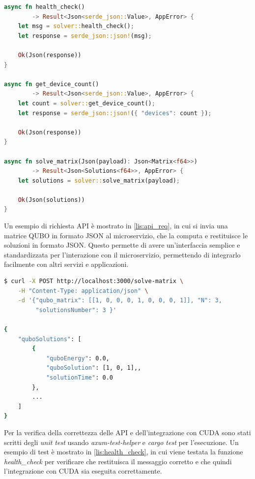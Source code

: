 \vspace{5mm}
\begin{lstlisting}[language=Rust, caption=Web API, label=lis:api]
async fn health_check()
        -> Result<Json<serde_json::Value>, AppError> {
    let msg = solver::health_check();
    let response = serde_json::json!(msg);

    Ok(Json(response))
}

async fn get_device_count()
        -> Result<Json<serde_json::Value>, AppError> {
    let count = solver::get_device_count();
    let response = serde_json::json!({ "devices": count });

    Ok(Json(response))
}

async fn solve_matrix(Json(payload): Json<Matrix<f64>>)
        -> Result<Json<Solutions<f64>>, AppError> {
    let solutions = solver::solve_matrix(payload);

    Ok(Json(solutions))
}
\end{lstlisting}
\vspace{5mm}


Un esempio di richiesta \gls{API} è mostrato in \ref{lis:api_req}, in cui si invia una matrice \gls{QUBO} in formato \gls{JSON} al microservizio, che la computa e restituisce le soluzioni in formato \gls{JSON}. Questo permette di avere un'interfaccia semplice e standardizzata per l'interazione con il microservizio, permettendo di integrarlo facilmente con altri servizi e applicazioni.

\newpage
\vspace{5mm}
\begin{lstlisting}[language=bash, caption=Esempio richiesta API, label=lis:api_req]
$ curl -X POST http://localhost:3000/solve-matrix \
    -H "Content-Type: application/json" \
    -d '{"qubo_matrix": [[1, 0, 0, 0, 1, 0, 0, 0, 1]], "N": 3,
         "solutionsNumber": 3 }'

{
    "quboSolutions": [
        {
            "quboEnergy": 0.0,
            "quboSolution": [1, 0, 1],,
            "solutionTime": 0.0
        },
        ...
    ]
}
\end{lstlisting}
\vspace{5mm}

Per la verifica della correttezza delle API e dell'integrazione con \gls{CUDA} sono stati scritti degli \textit{unit test} usando \textit{axum-test-helper} e \textit{cargo test} per l'esecuzione. Un esempio di test è mostrato in \ref{lis:health_check}, in cui viene testata la funzione \textit{health\_check} per verificare che restituisca il messaggio corretto e che quindi l'integrazione con \gls{CUDA} sia eseguita correttamente.

